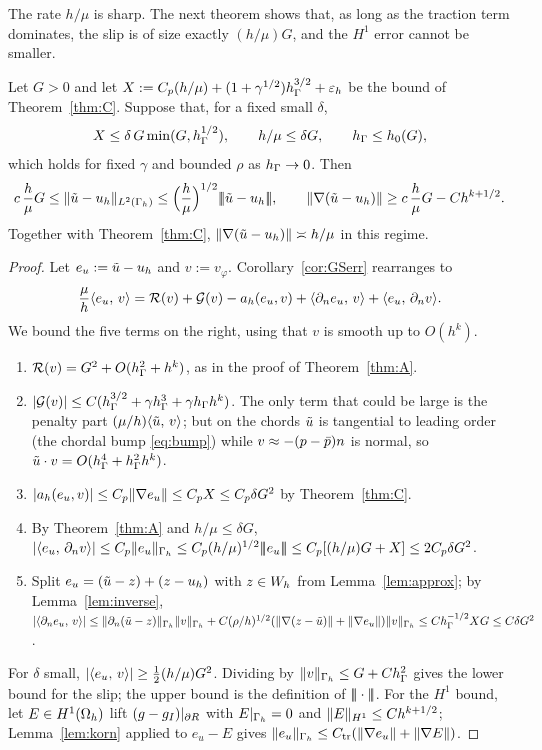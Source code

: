 The rate $h/\mu$ is sharp. The next theorem shows that, as long as the traction term dominates, the slip is of size exactly $(h/\mu)G$, and the $H^1$ error cannot be smaller.

\begin{theorem}\label{thm:B}
Let $G>0$ and let $X:=C_p(h/\mu)+(1+\gamma^{1/2})h_\Gamma^{3/2}+\varepsilon_h$ be the bound of Theorem~\ref{thm:C}. Suppose that, for a fixed small $\delta$,
\[
X\le\delta\,G\min(G,h_\Gamma^{1/2}),\qquad h/\mu\le\delta G,\qquad h_\Gamma\le h_0(G),
\]
which holds for fixed $\gamma$ and bounded $\rho$ as $h_\Gamma\to0$. Then
\[
c\,\frac h\mu G\le\lVert \tilde u-u_h\rVert_{L^2(\Gamma_h)}\le\Bigl(\frac h\mu\Bigr)^{1/2}|\!|\!|\tilde u-u_h|\!|\!|,\qquad
\lVert \nabla(\tilde u-u_h)\rVert\ge c\,\frac h\mu G-Ch^{k+1/2}.
\]
Together with Theorem~\ref{thm:C}, $\lVert \nabla(\tilde u-u_h)\rVert\asymp h/\mu$ in this regime.
\end{theorem}

\begin{proof}
Let $e_u:=\tilde u-u_h$ and $v:=v_\varphi$. Corollary~\ref{cor:GSerr} rearranges to
\[
\frac\mu h\langle e_u,\, v\rangle=\mathcal R(v)+\mathcal G(v)-a_h(e_u,v)+\langle \partial_n e_u,\, v\rangle+\langle e_u,\, \partial_n v\rangle.
\]
We bound the five terms on the right, using that $v$ is smooth up to $O(h^k)$.
\begin{enumerate}
\item $\mathcal R(v)=G^2+O(h_\Gamma^2+h^k)$, as in the proof of Theorem~\ref{thm:A}.
\item $|\mathcal G(v)|\le C(h_\Gamma^{3/2}+\gamma h_\Gamma^3+\gamma h_\Gamma h^k)$. The only term that could be large is the penalty part $(\mu/h)\langle \tilde u,\, v\rangle$; but on the chords $\tilde u$ is tangential to leading order (the chordal bump \eqref{eq:bump}) while $v\approx-(p-\bar p)n$ is normal, so $\tilde u\cdot v=O(h_\Gamma^4+h_\Gamma^2h^k)$.
\item $|a_h(e_u,v)|\le C_p\lVert \nabla e_u\rVert\le C_pX\le C_p\delta G^2$ by Theorem~\ref{thm:C}.
\item By Theorem~\ref{thm:A} and $h/\mu\le\delta G$, $|\langle e_u,\, \partial_n v\rangle|\le C_p\lVert e_u\rVert_{\Gamma_h}\le C_p(h/\mu)^{1/2}|\!|\!|e_u|\!|\!|\le C_p[(h/\mu)G+X]\le2C_p\delta G^2$.
\item Split $e_u=(\tilde u-z)+(z-u_h)$ with $z\in W_h$ from Lemma~\ref{lem:approx}; by Lemma~\ref{lem:inverse}, $|\langle \partial_n e_u,\, v\rangle|\le\lVert \partial_n(\tilde u-z)\rVert_{\Gamma_h}\lVert v\rVert_{\Gamma_h}+C(\rho/h)^{1/2}(\lVert \nabla(z-\tilde u)\rVert+\lVert \nabla e_u\rVert)\lVert v\rVert_{\Gamma_h}\le Ch_\Gamma^{-1/2}XG\le C\delta G^2$.
\end{enumerate}
For $\delta$ small, $|\langle e_u,\, v\rangle|\ge\frac12(h/\mu)G^2$. Dividing by $\lVert v\rVert_{\Gamma_h}\le G+Ch_\Gamma^2$ gives the lower bound for the slip; the upper bound is the definition of $|\!|\!|\cdot|\!|\!|$. For the $H^1$ bound, let $E\in H^1(\Omega_h)$ lift $(g-g_I)|_{\partial R}$ with $E|_{\Gamma_h}=0$ and $\lVert E\rVert_{H^1}\le Ch^{k+1/2}$; Lemma~\ref{lem:korn} applied to $e_u-E$ gives $\lVert e_u\rVert_{\Gamma_h}\le C_{\mathrm{tr}}(\lVert \nabla e_u\rVert+\lVert \nabla E\rVert)$.
\end{proof}

